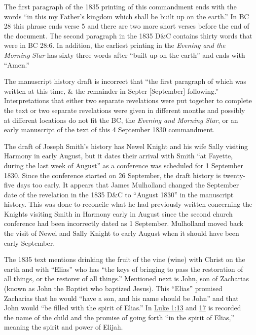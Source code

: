 		The first paragraph of the 1835 printing of this commandment ends with the words ``in this my Father's kingdom which shall be built up on the earth.'' In BC 28 this phrase ends verse 5 and there are two more short verses before the end of the document. The second paragraph in the 1835 D\&C contains thirty words that were in BC 28:6. In addition, the earliest printing in the \textit{Evening and the Morning Star} has sixty-three words after ``built up on the earth'' and ends with ``Amen.''

		The manuscript history draft is incorrect that ``the first paragraph of which was written at this time, \& the remainder in Septer [September] following.'' Interpretations that either two separate revelations were put together to complete the text or two separate revelations were given in different months and possibly at different locations do not fit the BC, the \textit{Evening and Morning Star}, or an early manuscript of the text of this 4 September 1830 commandment.

		The draft of Joseph Smith's history has Newel Knight and his wife Sally visiting Harmony in early August, but it dates their arrival with Smith ``at Fayette, during the last week of August'' as a conference was scheduled for 1 September 1830. Since the conference started on 26 September, the draft history is twenty-five days too early. It appears that James Mulholland changed the September date of the revelation in the 1835 D\&C to ``August 1830'' in the manuscript history. This was done to reconcile what he had previously written concerning the Knights visiting Smith in Harmony early in August since the second church conference had been incorrectly dated as 1 September. Mulholland moved back the visit of Newel and Sally Knight to early August when it should have been early September.

		\label{EXSS-DC27-JSR-ELIAS}
		The 1835 text mentions drinking the fruit of the vine (wine) with Christ on the earth and with ``Elias'' who has ``the keys of bringing to pass the restoration of all things, or the restorer of all things.'' Mentioned next is John, son of Zacharias (known as John the Baptist who baptized Jesus). This ``Elias'' promised Zacharias that he would ``have a son, and his name should be John'' and that John would ``be filled with the spirit of Elias.'' In \hyperref[LUKE-1-13]{Luke 1:13} and \hyperref[LUKE-1-17]{17} is recorded the name of the child and the promise of going forth ``in the spirit of Elias,'' meaning the spirit and power of Elijah.

